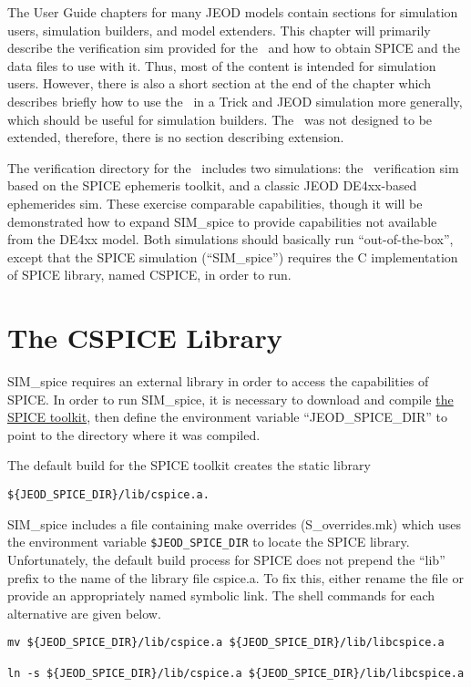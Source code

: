 The User Guide chapters for many JEOD models contain sections for simulation
users, simulation builders, and model extenders.  This chapter will primarily
describe the verification sim provided for the \SpiceDesc\ and how to obtain
SPICE and the data files to use with it.  Thus, most of the content is
intended for simulation users.  However, there is also a short section at the
end of the chapter which describes briefly how to use the \SpiceDesc\ in a
Trick and JEOD simulation more generally, which should be useful for simulation
builders. The \SpiceDesc\ was not designed to be extended, therefore, there is
no section describing extension.

The verification directory for the \SpiceDesc\ includes two simulations: the
\SpiceDesc\ verification sim based on the SPICE ephemeris toolkit, and a
classic JEOD DE4xx-based ephemerides sim. These exercise comparable
capabilities, though it will be demonstrated how to expand SIM\_spice to
provide capabilities not available from the DE4xx model. Both simulations
should basically run ``out-of-the-box'', except that the SPICE simulation
(``SIM\_spice'') requires the C implementation of SPICE library, named CSPICE,
in order to run.


\section {The CSPICE Library}
SIM\_spice requires an external library in order to access the capabilities of
SPICE. In order to run SIM\_spice, it is necessary to download and compile
\href{https://naif.jpl.nasa.gov/naif/toolkit.html}{the SPICE toolkit}, then
define the environment variable ``JEOD\_SPICE\_DIR'' to point to the directory
where it was compiled.

The default build for the SPICE toolkit creates the static library
\begin{verbatim}
${JEOD_SPICE_DIR}/lib/cspice.a.
\end{verbatim}
SIM\_spice includes a file containing make overrides (S\_overrides.mk) which
uses the environment variable \verb|$JEOD_SPICE_DIR| to locate the SPICE library.
Unfortunately, the default build process for SPICE does not prepend the ``lib''
prefix to the name of the library file cspice.a.  To fix this, either rename
the file or provide an appropriately named symbolic link. The shell commands
for each alternative are given below.
\begin{verbatim}
mv ${JEOD_SPICE_DIR}/lib/cspice.a ${JEOD_SPICE_DIR}/lib/libcspice.a

ln -s ${JEOD_SPICE_DIR}/lib/cspice.a ${JEOD_SPICE_DIR}/lib/libcspice.a
\end{verbatim}


